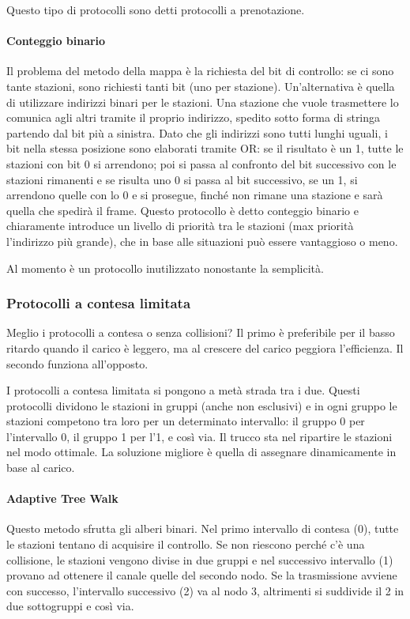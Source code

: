 Questo tipo di protocolli sono detti protocolli a prenotazione.

\paragraph{Conteggio binario}
Il problema del metodo della mappa è la richiesta del bit di controllo: se ci sono tante stazioni, sono richiesti tanti bit (uno per stazione).
Un'alternativa è quella di utilizzare indirizzi binari per le stazioni.
Una stazione che vuole trasmettere lo comunica agli altri tramite il proprio indirizzo, spedito sotto forma di stringa partendo dal bit più a sinistra.
Dato che gli indirizzi sono tutti lunghi uguali, i bit nella stessa posizione sono elaborati tramite OR: 
se il risultato è un 1, tutte le stazioni con bit 0 si arrendono;
poi si passa al confronto del bit successivo con le stazioni rimanenti e se risulta uno 0 si passa al bit successivo,
se un 1, si arrendono quelle con lo 0 e si prosegue, finché non rimane una stazione e sarà quella che spedirà il frame.
Questo protocollo è detto conteggio binario e chiaramente introduce un livello di priorità tra le stazioni (max priorità l'indirizzo più grande),
che in base alle situazioni può essere vantaggioso o meno.

Al momento è un protocollo inutilizzato nonostante la semplicità.

\subsubsection{Protocolli a contesa limitata}
Meglio i protocolli a contesa o senza collisioni?
Il primo è preferibile per il basso ritardo quando il carico è leggero, ma al crescere del carico peggiora l'efficienza.
Il secondo funziona all'opposto.

I protocolli a contesa limitata si pongono a metà strada tra i due.
Questi protocolli dividono le stazioni in gruppi (anche non esclusivi) e in ogni gruppo le stazioni competono tra loro per un determinato intervallo:
il gruppo 0 per l'intervallo 0, il gruppo 1 per l'1, e così via.
Il trucco sta nel ripartire le stazioni nel modo ottimale.
La soluzione migliore è quella di assegnare dinamicamente in base al carico.

\paragraph{Adaptive Tree Walk}
Questo metodo sfrutta gli alberi binari.
Nel primo intervallo di contesa (0), tutte le stazioni tentano di acquisire il controllo. 
Se non riescono perché c'è una collisione, le stazioni vengono divise in due gruppi e 
nel successivo intervallo (1) provano ad ottenere il canale quelle del secondo nodo.
Se la trasmissione avviene con successo, l'intervallo successivo (2) va al nodo 3, altrimenti si suddivide il 2 in due sottogruppi e così via.

